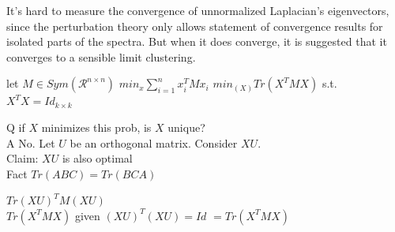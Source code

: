 {	It's hard to measure the convergence of unnormalized Laplacian's eigenvectors, since the perturbation theory only allows statement of convergence results for isolated parts of the spectra. But when it does converge, it is suggested that it converges to a sensible limit clustering.
	
	\begin{exercise}
		let $M \in Sym(\mathcal R^{n \times n})$
		$min_{x} \sum_{i=1}^{n} x_i^T M x_i$ $min_(X) Tr(X^T M X)$ s.t. $X^TX = Id_{k\times k}$ 
		
		Q if $X$ minimizes this prob, is $X$ unique?\\
		A No. Let $U$ be an orthogonal matrix.  Consider $XU$. \\
		Claim: $XU$ is also optimal\\
		
		Fact $Tr(ABC) = Tr(BCA)$ \\
		
		\begin{center}
			$Tr(XU)^T M (XU)$\\
			$ Tr(X^T M X)$ given $(XU)^T(XU) = Id$
			$=Tr(X^TMX)$
		\end{center}
		
	\end{exercise}
}

